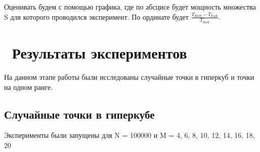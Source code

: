 Оценивать будем с помощью графика, где по абсцисе будет мощность множества S для которого проводился эксперимент. По ординате будет $\frac{T_\text{BOS} - T_\text{Fast}}{T_\text{max}}$.

\section{Результаты экспериментов}

На данном этапе работы были исследованы случайные точки в гиперкуб и точки на одном ранге. 

\subsection{Случайные точки в гиперкубе}


Эксперименты были запущены для N = 100000 и M = {4, 6, 8, 10, 12, 14, 16, 18, 20}

